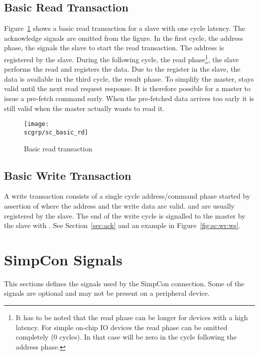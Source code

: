 \subsection{Basic Read Transaction}

Figure~\ref{fig:sc:basic:rd} shows a basic read transaction for a
slave with one cycle latency. The acknowledge signals are omitted
from the figure. In the first cycle, the address phase, the 
signals the slave to start the read transaction. The address is
registered by the slave. During the following cycle, the read
phase\footnote{It has to be noted that the read phase can be longer
for devices with a high latency. For simple on-chip IO devices the
read phase can be omitted completely (0 cycles). In that case
 will be zero in the cycle following the address
phase.}, the slave performs the read and registers the data. Due to
the register in the slave, the data is available in the third cycle,
the result phase. To simplify the master,  stays valid
until the next read request response. It is therefore possible for a
master to issue a pre-fetch command early. When the pre-fetched data
arrives too early it is still valid when the master actually wants to
read it.

\begin{figure}
    \centering
    \texttt{[image: \\scgrp/sc\_basic\_rd]}
    \caption{Basic read transaction}
    \label{fig:sc:basic:rd}
\end{figure}

\subsection{Basic Write Transaction}

A write transaction consists of a single cycle address/command phase
started by assertion of  where the address and the write
data are valid.  and  are usually
registered by the slave. The end of the write cycle is signalled to
the master by the slave with . See
Section~\ref{sec:ack} and an example in Figure~\ref{fig:sc:wr:ws}.

\section{SimpCon Signals}

This sections defines the signals used by the SimpCon connection.
Some of the signals are optional and may not be present on a
peripheral device.

